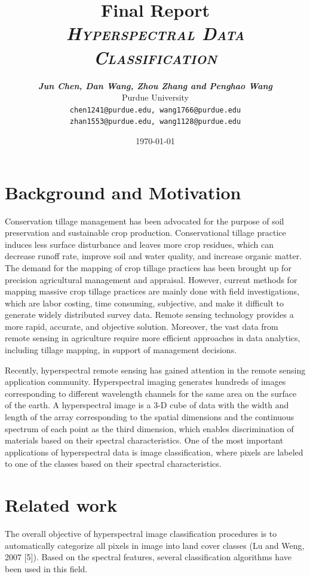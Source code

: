 \documentclass[11pt]{article}
\title{
\textbf{Final Report} \\ \textsc{\textit{Hyperspectral Data Classification}} \\
}
\author{
	\textbf{\textit{Jun Chen, Dan Wang, Zhou Zhang and  Penghao Wang}} \\
	Purdue University\\
	\texttt{chen1241@purdue.edu, wang1766@purdue.edu}\\
	\texttt{zhan1553@purdue.edu, wang1128@purdue.edu}
}
\date{\today}
\begin{document}
\maketitle


\section{Background and Motivation}

Conservation tillage management has been advocated for the purpose of soil preservation and sustainable crop production. Conservational tillage practice induces less surface disturbance and leaves more crop residues, which can decrease runoff rate, improve soil and water quality, and increase organic matter. The demand for the mapping of crop tillage practices has been brought up for precision agricultural management and appraisal. However, current methods for mapping massive crop tillage practices are mainly done with field investigations, which are labor costing, time consuming, subjective, and make it difficult to generate widely distributed survey data. Remote sensing technology provides a more rapid, accurate, and objective solution. Moreover, the vast data from remote sensing in agriculture require more efficient approaches in data analytics, including tillage mapping, in support of management decisions.

Recently, hyperspectral remote sensing has gained attention in the remote sensing application community. Hyperspectral imaging generates hundreds of images corresponding to different wavelength channels for the same area on the surface of the earth. A hyperspectral image is a 3-D cube of data with the width and length of the array corresponding to the spatial dimensions and the continuous spectrum of each point as the third dimension, which enables discrimination of materials based on their spectral characteristics. One of the most important applications of hyperspectral data is image classification, where pixels are labeled to one of the classes based on their spectral characteristics.


\section{Related work}
The overall objective of hyperspectral image classification procedures is to automatically categorize all pixels in image into land cover classes (Lu  and Weng, 2007 [5]). Based on the spectral features, several classification algorithms have been used in this field.
\end{document}
